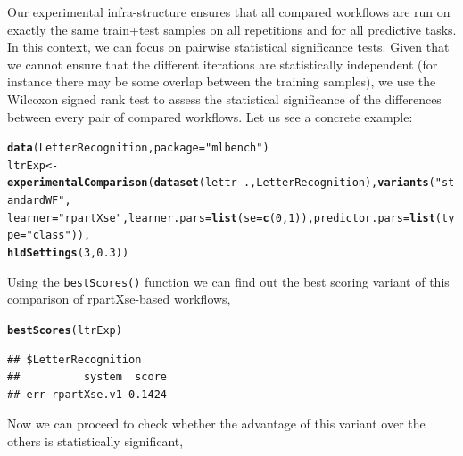 \documentclass[10pt,a4paper]{article}\usepackage[]{graphicx}\usepackage[]{color}
\makeatletter
\newcommand{\hlnum}[1]{\textcolor[rgb]{0.686,0.059,0.569}{#1}}%
\newcommand{\hlstr}[1]{\textcolor[rgb]{0.192,0.494,0.8}{#1}}%
\newcommand{\hlopt}[1]{\textcolor[rgb]{0,0,0}{#1}}%
\newcommand{\hlstd}[1]{\textcolor[rgb]{0.345,0.345,0.345}{#1}}%
\newcommand{\hlkwb}[1]{\textcolor[rgb]{0.69,0.353,0.396}{#1}}%
\newcommand{\hlkwc}[1]{\textcolor[rgb]{0.333,0.667,0.333}{#1}}%
\newcommand{\hlkwd}[1]{\textcolor[rgb]{0.737,0.353,0.396}{\textbf{#1}}}%
\newenvironment{kframe}{%
 \def\at@end@of@kframe{}%
 \ifinner\ifhmode%
  \def\at@end@of@kframe{\end{minipage}}%
  \begin{minipage}{\columnwidth}%
 \fi\fi%
 \def\FrameCommand##1{\hskip\@totalleftmargin \hskip-\fboxsep
 \colorbox{shadecolor}{##1}\hskip-\fboxsep
     \hskip-\linewidth \hskip-\@totalleftmargin \hskip\columnwidth}%
 \MakeFramed {\advance\hsize-\width
   \@totalleftmargin\z@ \linewidth\hsize
   \@setminipage}}%
 {\par\unskip\endMakeFramed%
 \at@end@of@kframe}
\newenvironment{knitrout}{}{} %
\makeatother
\begin{document}
Our experimental infra-structure ensures that all compared workflows
are run on exactly the same train+test samples on all repetitions and
for all predictive tasks. In this context, we can focus on pairwise
statistical significance tests. Given that we cannot ensure that the
different iterations are statistically independent (for instance there
may be some overlap between the training samples), we use the Wilcoxon
signed rank test to assess the statistical significance of the
differences between every pair of compared workflows. Let us see a
concrete example:




\begin{knitrout}
\color{fgcolor}\begin{kframe}
\begin{alltt}
\hlkwd{data}\hlstd{(LetterRecognition,} \hlkwc{package} \hlstd{=} \hlstr{"mlbench"}\hlstd{)}
\hlstd{ltrExp} \hlkwb{<-} \hlkwd{experimentalComparison}\hlstd{(}\hlkwd{dataset}\hlstd{(lettr} \hlopt{~} \hlstd{., LetterRecognition),} \hlkwd{variants}\hlstd{(}\hlstr{"standardWF"}\hlstd{,}
    \hlkwc{learner} \hlstd{=} \hlstr{"rpartXse"}\hlstd{,} \hlkwc{learner.pars} \hlstd{=} \hlkwd{list}\hlstd{(}\hlkwc{se} \hlstd{=} \hlkwd{c}\hlstd{(}\hlnum{0}\hlstd{,} \hlnum{1}\hlstd{)),} \hlkwc{predictor.pars} \hlstd{=} \hlkwd{list}\hlstd{(}\hlkwc{type} \hlstd{=} \hlstr{"class"}\hlstd{)),}
    \hlkwd{hldSettings}\hlstd{(}\hlnum{3}\hlstd{,} \hlnum{0.3}\hlstd{))}
\end{alltt}
\end{kframe}
\end{knitrout}


Using the \texttt{bestScores()} function we can find out the best
scoring variant of this comparison of rpartXse-based workflows,

\begin{knitrout}
\color{fgcolor}\begin{kframe}
\begin{alltt}
\hlkwd{bestScores}\hlstd{(ltrExp)}
\end{alltt}
\begin{verbatim}
## $LetterRecognition
##          system  score
## err rpartXse.v1 0.1424
\end{verbatim}
\end{kframe}
\end{knitrout}


Now we can proceed to check whether the advantage of this variant over
the others is statistically significant,
\end{document}
